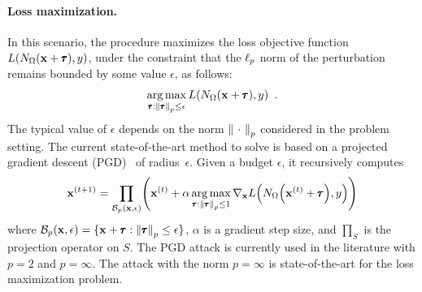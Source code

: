 \paragraph{Loss maximization.}
In this scenario, the procedure maximizes the loss objective function $L(N_\Omega(\mathbf{x} + \pmb{\tau}), y)$, under the constraint that the $\ell_p $ norm of the perturbation remains bounded by some value $\epsilon$, as follows:
\begin{equation} \label{equation:ch2-lossmax}
  \operatorname*{arg\,max}_{\pmb{\tau}:\norm{\pmb{\tau}}_p \leq \epsilon} L(N_\Omega(\mathbf{x} + \pmb{\tau}), y) \enspace.
\end{equation}
The typical value of $\epsilon$ depends on the norm $\norm{\ \cdot\ }_p$ considered in the problem setting.
The current state-of-the-art method to solve  is based on a projected gradient descent (PGD)~\cite{madry2018towards} of radius~$\epsilon$.
Given a budget $\epsilon$, it recursively computes
\begin{equation} \label{equation:ch2-projectionPGD}
  \xvec^{(t+1)} = \prod_{\mathcal{B}_p(\xvec,\epsilon)}\left(\xvec^{(t)}
    + \alpha \argmax_{\adv: \norm{\adv}_p \leq 1} \nabla_\xvec L\left( \nn_\weights \left(\xvec^{(t)} + \adv \right), y \right)
\right)
\end{equation}
where $\mathcal{B}_p(\mathbf{x},\epsilon) = \{ \mathbf{x} + \pmb{\tau}:\norm{\pmb{\tau}}_p \leq \epsilon\}$, $\alpha$ is a gradient step size, and $\prod_S$ is the projection operator on $S$.
The PGD attack is currently used in the literature with $p=2$ and $p=\infty$.
The attack with the norm $p=\infty$ is state-of-the-art for the loss maximization problem. 


